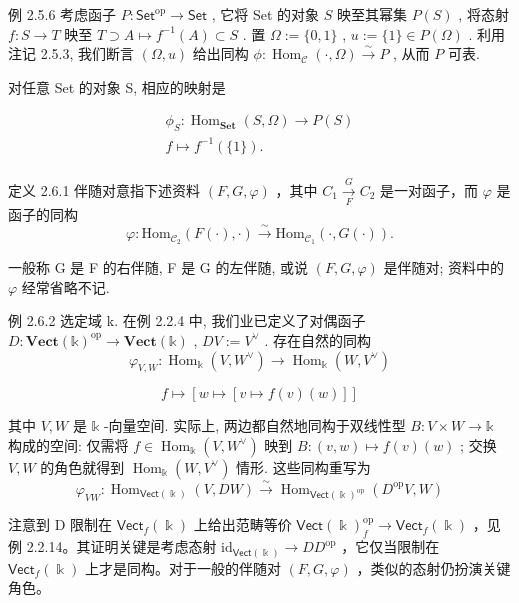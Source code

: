 \documentclass[]{article}
\begin{document}
例 2.5.6 考虑函子 $P: \mathsf{Set}^{\mathrm{op}} \to \mathsf{Set}$ , 它将 Set 的对象 $S$ 映至其幂集 $P(S)$ , 将态射 $f: S \to T$ 映至 $T \supset A \mapsto f^{-1}(A) \subset S$ . 置 $\Omega := \{0,1\}$ , $u := \{1\} \in P(\Omega)$ . 利用注记 2.5.3, 我们断言 $(\Omega, u)$ 给出同构 $\phi: \operatorname{Hom}_{\mathcal{C}}(\cdot, \Omega) \stackrel{\sim}{\to} P$ , 从而 $P$ 可表. 

对任意 Set 的对象 S, 相应的映射是 

$$
\begin{array}{l} \phi_ {S}: \operatorname{Hom} _ {\mathbf {S e t}} (S, \Omega) \longrightarrow P (S) \\ f \longmapsto f ^ {- 1} (\{1 \}). \\ \end{array}
$$

定义 2.6.1 伴随对意指下述资料 $(F,G,\varphi)$ ，其中 $C_{1}\xrightarrow[F]{G}C_{2}$ 是一对函子，而 $\varphi$ 是函子的同构  $$
\varphi : \mathrm{Hom} _ {\mathcal {C} _ {2}} (F (\cdot), \cdot) \xrightarrow {\sim} \mathrm{Hom} _ {\mathcal {C} _ {1}} (\cdot , G (\cdot)).
$$

一般称 G 是 F 的右伴随, F 是 G 的左伴随, 或说 $(F,G,\varphi)$ 是伴随对; 资料中的 $\varphi$ 经常省略不记. 

例 2.6.2 选定域 k. 在例 2.2.4 中, 我们业已定义了对偶函子 $D: \mathbf{Vect}(\mathbb{k})^{\mathrm{op}} \to \mathbf{Vect}(\mathbb{k})$ , $DV := V^{\vee}$ . 存在自然的同构 $$
\varphi_ {V, W}: \operatorname{Hom} _ {\Bbbk} (V, W ^ {\vee}) \longrightarrow \operatorname{Hom} _ {\Bbbk} (W, V ^ {\vee})
$$

$$
f \longmapsto [ w \mapsto [ v \mapsto f (v) (w) ] ]
$$

其中 $V, W$ 是 $\mathbb{k}$ -向量空间. 实际上, 两边都自然地同构于双线性型 $B: V \times W \to \mathbb{k}$ 构成的空间: 仅需将 $f \in \operatorname{Hom}_{\mathbb{k}}(V, W^{\vee})$ 映到 $B: (v, w) \mapsto f(v)(w)$ ; 交换 $V, W$ 的角色就得到 $\operatorname{Hom}_{\mathbb{k}}(W, V^{\vee})$ 情形. 这些同构重写为 $$
\varphi_ {V W}: \operatorname{Hom} _ {\mathsf {V e c t} (\Bbbk)} (V, D W) \xrightarrow {\sim} \operatorname{Hom} _ {\mathsf {V e c t} (\Bbbk) ^ {\mathrm{op}}} (D ^ {\mathrm{op}} V, W)
$$

注意到 D 限制在 $\mathsf{Vect}_{f}(\Bbbk)$ 上给出范畴等价 $\mathsf{Vect}(\Bbbk)_{f}^{\mathrm{op}} \to \mathsf{Vect}_{f}(\Bbbk)$ ，见例 2.2.14。其证明关键是考虑态射 $\mathrm{id}_{\mathsf{Vect}(\Bbbk)} \to DD^{\mathrm{op}}$ ，它仅当限制在 $\mathsf{Vect}_{f}(\Bbbk)$ 上才是同构。对于一般的伴随对 $(F, G, \varphi)$ ，类似的态射仍扮演关键角色。 
\end{document}
